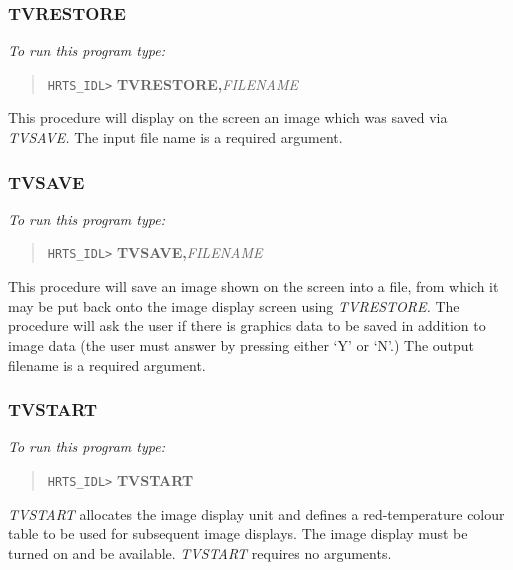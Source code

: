 \subsubsection{TVRESTORE}

{\em To run this program type:}
\begin{quote}
     {\tt HRTS\_IDL>} {\bf TVRESTORE,}{\it FILENAME}
\end{quote}
This procedure will display on the  screen an image which was saved via {\em
TVSAVE.} The input file name is a required argument.

\subsubsection{TVSAVE}

{\em To run this program type:}
\begin{quote}
    {\tt HRTS\_IDL>} {\bf TVSAVE,}{\it FILENAME}
\end{quote}
This procedure will save an image shown on the  screen into a file, from which
it may be put back onto the image display screen using {\em TVRESTORE.}  The
procedure will ask the user if there is graphics data to be saved in addition
to image data (the user must answer by pressing either `Y' or `N'.)  The output
filename is a required argument.

\subsubsection{TVSTART}

{\em To run this program type:}
\begin{quote}
     {\tt HRTS\_IDL>} {\bf TVSTART}
\end{quote}
{\em TVSTART} allocates the image display unit and defines a red-temperature
colour table to be used for subsequent image displays. The image display must
be turned  on and be available. {\em TVSTART} requires no arguments.

\typeout{ }
\typeout{ }


